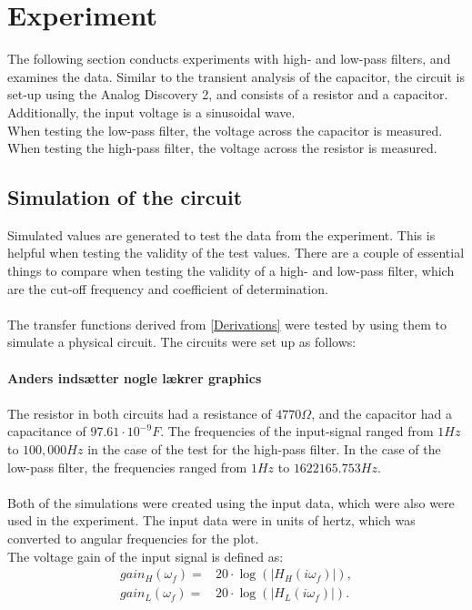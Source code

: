 \section{Experiment} \label{experiment}
The following section conducts experiments with high- and low-pass filters, and examines the data. Similar to the transient analysis of the capacitor, the circuit is set-up using the Analog Discovery 2, and consists of a resistor and a capacitor. Additionally, the input voltage  is a  sinusoidal wave. \\
When testing the low-pass filter, the voltage across the capacitor is measured. When testing the high-pass filter, the voltage across the resistor is measured.

\subsection{Simulation of the circuit}
Simulated values are generated to test the data from the experiment. This is helpful when testing the validity of the test values. There are a couple of essential things to compare when testing the validity of a high- and low-pass filter, which are the cut-off frequency and coefficient of determination. 
\\ \\
The transfer functions derived from \cref{Derivations} were tested by using them to simulate a physical circuit. The circuits were set up as follows:
\\
\\
\textbf{Anders indsætter nogle lækrer graphics} 
\\
\\
The resistor in both circuits had a resistance of $4770 \Omega$, and the capacitor had a capacitance of $97.61\cdot 10^{-9} F$. The frequencies of the input-signal ranged from $1 Hz$ to $100,000 Hz$ in the case of the test for the high-pass filter. In the case of the low-pass filter, the frequencies ranged from $1 Hz$ to $1622165.753 Hz$.
\\
\\
Both of the simulations were created using the input data, which were also were used in the experiment. The input data were in units of hertz, which was converted to angular frequencies for the plot.
\\
The voltage gain of the input signal is defined as:
\begin{align*}
	gain_H(\omega _f) =&20 \cdot \log{\left( \left|H_{H}(i \omega_f)\right| \right)},
	\\
	gain_L(\omega _f) =&20 \cdot \log{\left( \left|H_{L}(i \omega_f)\right| \right)}.
\end{align*}

